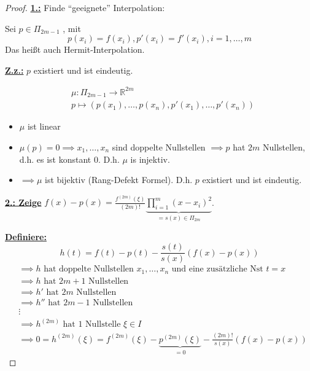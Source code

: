 \documentclass{book}
\def\R{\mathbb{R}}
\begin{document}
            \begin{proof}
                \underline{\textbf{1.:}} Finde ``geeignete'' Interpolation: 

                Sei $p\in\Pi_{2m-1}$ , mit 
                \begin{equation}\label{g57}
                    p(x_i)=f(x_i),p'(x_i)=f'(x_i), i=1,\dots,m
                \end{equation}
                Das heißt auch Hermit-Interpolation.

                \underline{\textbf{Z.z.:}} $p$ existiert und ist eindeutig.

                \begin{align*}
                    &\mu:\Pi_{2m-1}\to \R^{2m}\\
                    &p\mapsto (p(x_1),\dots,p(x_n),p'(x_1),\dots,p'(x_n))
                \end{align*}

                \begin{itemize}
                    \item $\mu$ ist linear
                    \item $\mu(p)=0 \implies x_1,\dots,x_n$ sind doppelte Nullstellen
                        $\implies p$ hat $2m$ Nullstellen, d.h. es ist konstant $0$. D.h. $\mu$ is injektiv.
                    \item $\implies \mu$ ist bijektiv (Rang-Defekt Formel). D.h. $p$ existiert und ist eindeutig. 
                \end{itemize}

                \underline{\textbf{2.: Zeige}}  $f(x)-p(x)=\frac{f^{(2m)}(\xi)}{(2m)!}\underbrace{\prod_{i=1}^{m} (x-x_i)^2}_{=s(x)\in\Pi_{2m}}$.

                \underline{\textbf{Definiere:}}
                \[h(t)=f(t)-p(t)-\frac{s(t)}{s(x)}(f(x)-p(x))\]
                \begin{align*}
                    &\implies h \text{ hat doppelte Nullstellen } x_1,\dots, x_n \text{ und eine zusätzliche Nst } t=x\\
                    &\implies h \text{ hat } 2m+1 \text{ Nullstellen}\\
                    &\implies h' \text{ hat } 2m \text{ Nullstellen}\\
                    &\implies h'' \text{ hat } 2m -1\text{ Nullstellen}\\
                    & \vdots \\
                    & \implies h^{(2m)} \text{ hat } 1 \text{ Nullstelle } \xi \in I\\
                    &\implies  0=h^{(2m)}(\xi)=f^{(2m)}(\xi)-\underbrace{p^{(2m)}(\xi)}_{=0}-\frac{(2m)!}{s(x)}(f(x)-p(x))
                \end{align*}


\end{proof}
\end{document}
